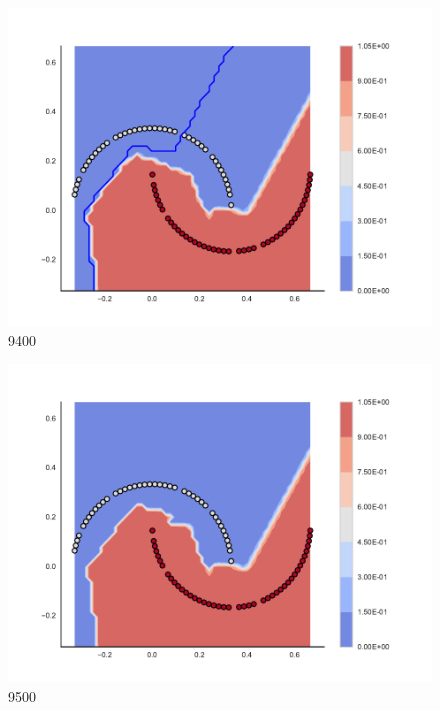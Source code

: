 \begin{subfigure}[b]{0.09\textwidth}
    \includegraphics[clip, trim=2.35cm 1.75cm 4.5cm 0cm,width=\textwidth]{img/convergence/9400.pdf}
    \caption{9400}
    \label{fig:convergence_9400}
\end{subfigure}
%
\begin{subfigure}[b]{0.09\textwidth}
    \includegraphics[clip, trim=2.35cm 1.75cm 4.5cm 0cm,width=\textwidth]{img/convergence/9500.pdf}
    \caption{9500}
    \label{fig:convergence_9500}
\end{subfigure}
%
